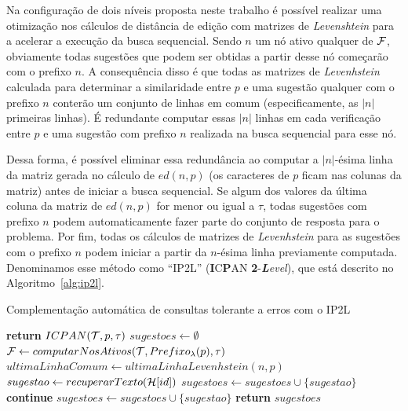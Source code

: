 Na configuração de dois níveis proposta neste trabalho é possível realizar uma otimização nos cálculos de distância de edição com matrizes de \textit{Levenshtein} para a acelerar a execução da busca sequencial. Sendo $n$ um nó ativo qualquer de $\mathcal{F}$, obviamente todas sugestões que podem ser obtidas a partir desse nó começarão com o prefixo $n$. A consequência disso é que todas as matrizes de \textit{Levenhstein} calculada para determinar a similaridade entre $p$ e uma sugestão qualquer com o prefixo $n$ conterão um conjunto de linhas em comum (especificamente, as $|n|$ primeiras linhas). É redundante computar essas $|n|$ linhas em cada verificação entre $p$ e uma sugestão com prefixo $n$ realizada na busca sequencial para esse nó. 

Dessa forma, é possível eliminar essa redundância ao computar a $|n|$-ésima linha da matriz gerada no cálculo de $ed(n,p)$ (os caracteres de $p$ ficam nas colunas da matriz) antes de iniciar a busca sequencial. Se algum dos valores da última coluna da matriz de $ed(n,p)$ for menor ou igual a $\tau$, todas sugestões com prefixo $n$ podem automaticamente fazer parte do conjunto de resposta para o problema. Por fim, todas os cálculos de matrizes de \textit{Levenhstein} para as sugestões com o prefixo $n$ podem iniciar a partir da $n$-ésima linha previamente computada. Denominamos esse método como ``IP2L'' (\textbf{I}C\textbf{P}AN \textbf{2}-\textit{\textbf{L}evel}), que está descrito no Algoritmo~\ref{alg:ip2l}.

\begin{algorithm}[H]
\caption{Complementação automática de consultas tolerante a erros com o IP2L}\label{alg:ip2l}
\begin{algorithmic}[1]
     \textbf{return} $ICPAN(\mathcal{T},p,\tau)$
    \EndIf
    \State $sugestoes \leftarrow \emptyset$
    \State $\mathcal{F} \leftarrow computarNosAtivos(\mathcal{T}, Prefixo_{\lambda}(p), \tau)$ 
     
        \State $ultimaLinhaComum \leftarrow ultimaLinhaLevenhstein(n, p)$
                \State $sugestao \leftarrow recuperarTexto(\mathcal{H}[id])$
                    \State $sugestoes \leftarrow sugestoes \cup \{ sugestao \}$
                    \State \textbf{continue}
                \EndIf
                    \State $sugestoes \leftarrow sugestoes \cup \{ sugestao \}$
                \EndIf
            \EndFor
        \EndFor
    \EndFor
    \State \textbf{return} $sugestoes$
\EndFunction
\end{algorithmic}
\end{algorithm}


